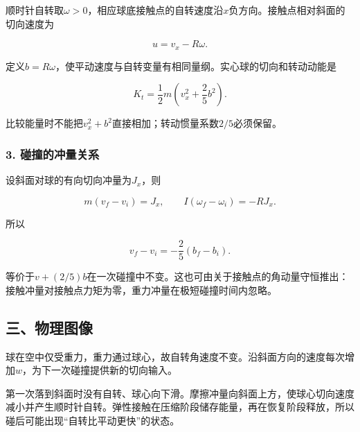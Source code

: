 \documentclass[12pt,a4paper,fontset=fandol]{ctexart}
\begin{document}
顺时针自转取\(\omega>0\)，相应球底接触点的自转速度沿\(x\)负方向。接触点相对斜面的切向速度为

\[
u=v_x-R\omega.
\]

定义\(b=R\omega\)，使平动速度与自转变量有相同量纲。实心球的切向和转动动能是

\[
K_t=\frac12m\left(v_x^2+\frac25b^2\right).
\]

比较能量时不能把\(v_x^2+b^2\)直接相加；转动惯量系数\(2/5\)必须保留。

\subsubsection{3.
碰撞的冲量关系}\label{ux78b0ux649eux7684ux51b2ux91cfux5173ux7cfb}

设斜面对球的有向切向冲量为\(J_x\)，则

\[
m(v_f-v_i)=J_x,\qquad
I(\omega_f-\omega_i)=-RJ_x.
\]

所以

\[
v_f-v_i=-\frac25(b_f-b_i).
\]

等价于\(v+(2/5)b\)在一次碰撞中不变。这也可由关于接触点的角动量守恒推出：接触冲量对接触点力矩为零，重力冲量在极短碰撞时间内忽略。

\subsection{三、物理图像}\label{ux4e09ux7269ux7406ux56feux50cf-2}

球在空中仅受重力，重力通过球心，故自转角速度不变。沿斜面方向的速度每次增加\(w\)，为下一次碰撞提供新的切向输入。

第一次落到斜面时没有自转、球心向下滑。摩擦冲量向斜面上方，使球心切向速度减小并产生顺时针自转。弹性接触在压缩阶段储存能量，再在恢复阶段释放，所以碰后可能出现``自转比平动更快''的状态。

\begin{center}
\begin{minipage}{\linewidth}
\centering\begingroup{}
\ifdim\wd\diagrambox>.88\linewidth
\sbox{\diagrambox}{\resizebox{.88\linewidth}{!}{\usebox{\diagrambox}}}\fi
\ifdim\ht\diagrambox>.38\textheight
\resizebox{!}{.38\textheight}{\usebox{\diagrambox}}
\else\usebox{\diagrambox}\fi
\par{}\endgroup\end{minipage}\end{center}
\end{document}
